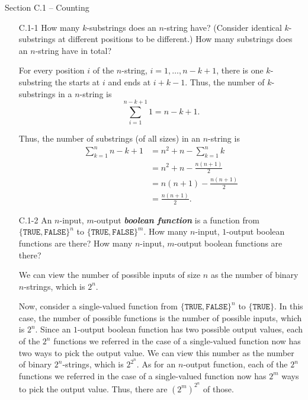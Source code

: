 \documentclass{report}
\makeatletter
\renewenvironment{framed}{%
 \def\FrameCommand##1{\hskip\@totalleftmargin
 \fboxsep=\FrameSep\fbox{##1}}%
 \MakeFramed {\advance\hsize-\width
   \@totalleftmargin\z@ \linewidth\hsize
   \@setminipage}}%
 {\par\unskip\endMakeFramed}
\makeatother
\begin{document}
\small

{\large Section C.1 {--} Counting}

\begin{enumerate}

\item[C.1{-}1] {How many $k$-substrings does an $n$-string have? (Consider
identical $k$-substrings at different positions to be different.) How many
substrings does an $n$-string have in total?}

\begin{framed}
For every position $i$ of the $n$-string, $i = 1, \dots, n - k + 1$, there is
one $k$-substring the starts at $i$ and ends at $i + k - 1$. Thus, the number of
$k$-substrings in a $n$-string is
\[
  \sum_{i = 1}^{n - k + 1} 1 = n - k + 1.
\]

Thus, the number of substrings (of all sizes) in an $n$-string is
\begin{equation*}
\begin{aligned}
  \sum_{k = 1}^{n} n - k + 1 &= n^2 + n - \sum_{k = 1}^{n} {k}\\
                             &= n^2 + n - \frac{n (n + 1)}{2}\\
                             &= n (n + 1) - \frac{n (n + 1)}{2}\\
                             &= \frac{n (n + 1)}{2}.
\end{aligned}
\end{equation*}
\end{framed}

\item[C.1{-}2] {An $n$-input, $m$-output \textbf{\emph{boolean function}} is
a function from $\{\texttt{TRUE}, \texttt{FALSE}\}^n$ to
$\{\texttt{TRUE}, \texttt{FALSE}\}^m$. How many $n$-input, $1$-output boolean
functions are there? How many $n$-input, $m$-output boolean functions are
there?}

\begin{framed}
We can view the number of possible inputs of size $n$ as the number of binary
$n$-strings, which is $2^n$.

Now, consider a single-valued function from $\{\texttt{TRUE},
\texttt{FALSE}\}^n$ to $\{\texttt{TRUE}\}$. In this case, the number of
possible functions is the number of possible inputs, which is $2^n$. Since an
$1$-output boolean function has two possible output values, each of the $2^n$
functions we referred in the case of a single-valued function now has two ways
to pick the output value. We can view this number as the number of binary
$2^n$-strings, which is $2^{2^n}$. As for an $n$-output function, each of the
$2^n$ functions we referred in the case of a single-valued function now has
$2^m$ ways to pick the output value. Thus, there are $({2^m})^{2^n}$ of those.
\end{framed}


\end{enumerate}
\end{document}
